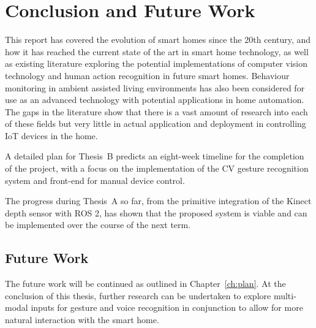 \chapter{Conclusion and Future Work}\label{ch:conclusion_future_work}

This report has covered the evolution of smart homes since the 20th century, and how it has reached the current state of the art in smart home technology, as well as existing literature exploring the potential implementations of computer vision technology and human action recognition in future smart homes.
Behaviour monitoring in ambient assisted living environments has also been considered for use as an advanced technology with potential applications in home automation.
The gaps in the literature show that there is a vast amount of research into each of these fields but very little in actual application and deployment in controlling IoT devices in the home.

A detailed plan for Thesis~B predicts an eight-week timeline for the completion of the project, with a focus on the implementation of the CV gesture recognition system and front-end for manual device control.

The progress during Thesis~A so far, from the primitive integration of the Kinect depth sensor with ROS 2, has shown that the proposed system is viable and can be implemented over the course of the next term.

\section{Future Work}
The future work will be continued as outlined in Chapter~\ref{ch:plan}.
At the conclusion of this thesis, further research can be undertaken to explore multi-modal inputs for gesture and voice recognition in conjunction to allow for more natural interaction with the smart home.